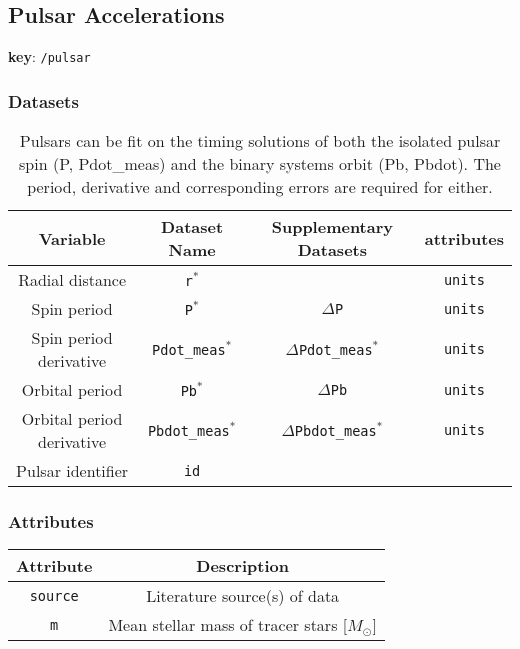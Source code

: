 \subsection{Pulsar Accelerations}

\textbf{key}: \texttt{/pulsar}

\subsubsection{Datasets}

\begin{center}
\begin{table}[H]
\begin{tabular}{ | c | c | c | c | }
    \hline
    Variable & Dataset Name & Supplementary Datasets &  attributes \\
    \hline\hline
    Radial distance & \texttt{r\(^*\)} & & \texttt{units} \\
    \hline
    Spin period & \texttt{P\(^*\)} & \texttt{\(\Delta\)P} & \texttt{units}\\
    \hline
    Spin period derivative & \texttt{Pdot\_meas\(^*\)} &
    \texttt{\(\Delta\)Pdot\_meas\(^*\)} & \texttt{units} \\
    \hline
    Orbital period & \texttt{Pb\(^*\)} & \texttt{\(\Delta\)Pb} & \texttt{units}\\
    \hline
    Orbital period derivative & \texttt{Pbdot\_meas\(^*\)} &
    \texttt{\(\Delta\)Pbdot\_meas\(^*\)} & \texttt{units} \\
    \hline
    Pulsar identifier & \texttt{id} & & \\
    \hline
\end{tabular}
\caption*{
    Pulsars can be fit on the timing solutions of both the isolated
    pulsar spin (P, Pdot\_meas) and the binary systems orbit (Pb, Pbdot).
    The period, derivative and corresponding errors are required for either.
}
\end{table}
\end{center}

\subsubsection{Attributes}


\begin{center}
\begin{table}[H]
\begin{tabular}{ | c | c | }
    \hline
    Attribute & Description \\
    \hline\hline
    \texttt{source} & Literature source(s) of data \\
    \hline
    \texttt{m} & Mean stellar mass of tracer stars [\(M_\odot\)] \\
    \hline
\end{tabular}
\end{table}
\end{center}

